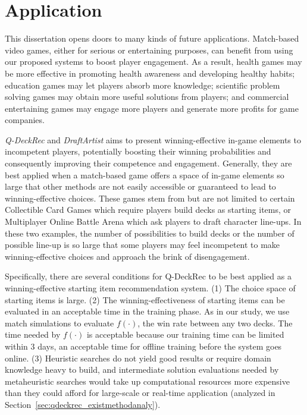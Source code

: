 \chapter{Application} %

\label{chapter:application} 

This dissertation opens doors to many kinds of future applications. Match-based video games, either for serious or entertaining purposes, can benefit from using our proposed systems to boost player engagement. As a result, health games may be more effective in promoting health awareness and developing healthy habits; education games may let players absorb more knowledge; scientific problem solving games may obtain more useful solutions from players; and commercial entertaining games may engage more players and generate more profits for game companies.  

\textit{Q-DeckRec} and \textit{DraftArtist} aims to present winning-effective in-game elements to incompetent players, potentially boosting their winning probabilities and consequently improving their competence and engagement. Generally, they are best applied when a match-based game offers a space of in-game elements so large that other methods are not easily accessible or guaranteed to lead to winning-effective choices. These games stem from but are not limited to certain Collectible Card Games which require players build decks as starting items, or Multiplayer Online Battle Arena which ask players to draft character line-ups. In these two examples, the number of possibilities to build decks or the number of possible line-up is so large that some players may feel incompetent to make winning-effective choices and approach the brink of disengagement. 

Specifically, there are several conditions for Q-DeckRec to be best applied as a winning-effective starting item recommendation system. (1) The choice space of starting items is large. (2) The winning-effectiveness of starting items can be evaluated in an acceptable time in the training phase. As in our study, we use match simulations to evaluate $f(\cdot)$, the win rate between any two decks. The time needed by $f(\cdot)$ is acceptable because our training time can be limited within 3 days, an acceptable time for offline training before the system goes online. (3) Heuristic searches do not yield good results or require domain knowledge heavy to build, and intermediate solution evaluations needed by metaheuristic searches would take up computational resources more expensive than they could afford for large-scale or real-time application (analyzed in Section~\ref{sec:qdeckrec_existmethodanaly}).

